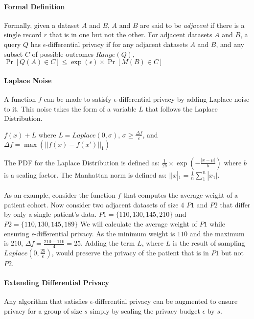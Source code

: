 \paragraph{Formal Definition}
Formally, given a dataset $A$ and $B$, $A$ and $B$ are said to be \textit{adjacent} if there is a single record $r$ that is in one but not the other. For adjacent datasets $A$ and $B$, a query $Q$ has $\epsilon$-differential privacy if for any adjacent datasets $A$ and $B$, and any subset $C$ of possible outcomes $Range(Q)$, $\Pr[Q(A) \in C] \leq \exp(\epsilon) \times \Pr[M(B) \in C]$

\paragraph{Laplace Noise}
A function $f$ can be made to satisfy $\epsilon$-differential privacy by adding Laplace noise to it. This noise takes the form of a variable $L$ that follows the Laplace Distribution. 

\bigbreak
\centerline{$f(x) + L$ where $L = Laplace(0, \sigma)$, $\sigma \geq \frac{\Delta f}{\epsilon}$, and $\Delta f = \max(||f(x) - f(x')||_1)$}
\bigbreak

The PDF for the Laplace Distribution is defined as: $\frac{1}{2b} \times \exp(-\frac{|x - \mu|}{b})$ where $b$ is a scaling factor. The Manhattan norm is defined as: $||x|_1 = \frac{1}{n} \sum_1^n |x_1|$.

\paragraph{}
As an example, consider the function $f$ that computes the average weight of a patient cohort. Now consider two adjacent datasets of size $4$ $P1$ and $P2$ that differ by only a single patient's data. $P1 = \{110, 130, 145, 210\}$ and $P2 = \{110, 130, 145, 189\}$ We will calculate the average weight of $P1$ while ensuring $\epsilon$-differential privacy. As the minimum weight is $110$ and the maximum is $210$, $\Delta f = \frac{210 - 110}{4} = 25$. Adding the term $L$, where $L$ is the result of sampling $Laplace(0, \frac{25}{\epsilon})$, would preserve the privacy of the patient that is in $P1$ but not $P2$.

\paragraph{Extending Differential Privacy}

Any algorithm that satisfies $\epsilon$-differential privacy can be augmented to ensure privacy for a group of size $s$ simply by scaling the privacy budget $\epsilon$ by $s$.

